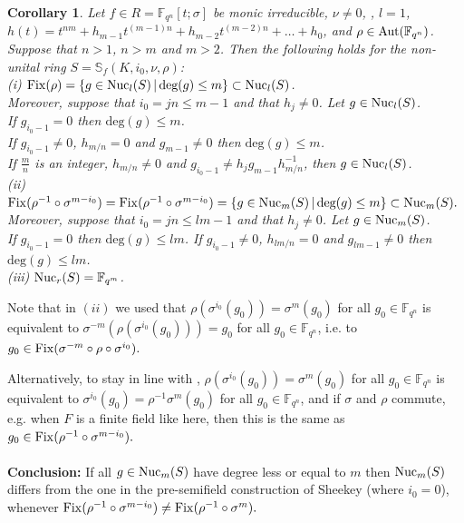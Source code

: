 \documentclass[12pt]{amsart}
\theoremstyle{plain}
\newtheorem{corollary}[theorem]{Corollary}
\theoremstyle{definition}
\numberwithin{equation}{section}
\numberwithin{figure}{section}
\begin{document}
\begin{corollary}\label{cor:nuclei K2} 
Let $f\in R=\mathbb{F}_{q^n}[t;\sigma]$ be monic irreducible, $\nu\neq 0$, , $l=1$, 
$h(t)=t^{nm}+h_{m-1}t^{(m-1)n}+h_{m-2}t^{(m-2)n}+\dots+h_0$, and $\rho\in {\rm Aut}(\mathbb{F}_{q^n})$.
Suppose that $n>1$, $n>m$ and $m>2$.
 Then the following holds for the non-unital ring  $S=\mathbb{S}_f(K,i_0,\nu,\rho)$:
\\ (i) ${\rm Fix}(\rho)=\{g\in {\rm Nuc}_l(S)\,|\, \text{deg}(g)\leq m\}\subset  {\rm Nuc}_l(S)$.
\\
Moreover, suppose that $i_0=jn \leq m-1$ and  that $h_j\not=0$. Let $g \in {\rm Nuc}_l(S)$.\\
If $g_{i_0-1}=0$ then $\text{deg}(g)\leq m$.\\
 If $g_{i_0-1}\not=0$, $h_{m/n} =0$  and  $g_{m-1}\not=0 $
then $\text{deg}(g)\leq m$.
\\ If $\frac{m}{n}$ is  an integer, $h_{m/n}\not =0$ and $ g_{i_0-1}\not =h_j g_{m-1}h_{m/n}^{-1}$,
then $g \in  {\rm Nuc}_l(S)$.
\\ (ii) ${\rm Fix}(\rho^{-1}  \circ\sigma^{m-i_0})={\rm Fix}(\rho^{-1}  \circ\sigma^{m-i_0}) 
= \{ g\in {\rm Nuc}_m(S) \,|\, \text{deg}(g)\leq m\}\subset  {\rm Nuc}_m(S).$
Moreover, suppose that $i_0=jn \leq lm-1$ and  that $h_j\not=0$. Let $g \in {\rm Nuc}_m(S)$.\\
If $g_{i_0-1}=0$ then $\text{deg}(g)\leq lm$.  If $g_{i_0-1}\not=0$, $h_{lm/n} =0$  and  $g_{lm-1}\not=0 $
then $\text{deg}(g)\leq lm$.
\\ (iii) 
${\rm Nuc}_r(S)=\mathbb{F}_{q^m}$.
\end{corollary}

Note that in $(ii)$ we used that $\rho(\sigma^{i_0}(g_0)) = \sigma^{m}(g_0)$ for all $g_0\in \mathbb{F}_{q^n}$ is equivalent to $\sigma^{-m}(\rho(\sigma^{i_0}(g_0)) )=
g_0$ for all $g_0\in \mathbb{F}_{q^n}$, i.e. to $g_0\in {\rm Fix}(\sigma^{-m}\circ \rho \circ\sigma^{i_0}).$


Alternatively, to stay in line with \cite{Sheekey},
$\rho(\sigma^{i_0}(g_0)) = \sigma^{m}(g_0)$ for all $g_0\in \mathbb{F}_{q^n}$ is equivalent to $\sigma^{i_0}(g_0) = \rho^{-1}\sigma^{m}(g_0)$ for all $g_0\in \mathbb{F}_{q^n}$, and if $\sigma$ and $\rho$ commute, e.g. when $F$ is a finite field like here, then this is the same as $g_0\in {\rm Fix}(\rho^{-1}  \circ\sigma^{m-i_0}).$  
\\\\
{\bf Conclusion:}
If all $g\in  {\rm Nuc}_m(S)$ have degree less or equal to $m$ then $ {\rm Nuc}_m(S)$  differs from the one in the pre-semifield construction of Sheekey (where $i_0=0$), whenever ${\rm Fix}(\rho^{-1}  \circ\sigma^{m-i_0})\not = {\rm Fix}(\rho^{-1}  \circ\sigma^{m}).$
\end{document}
